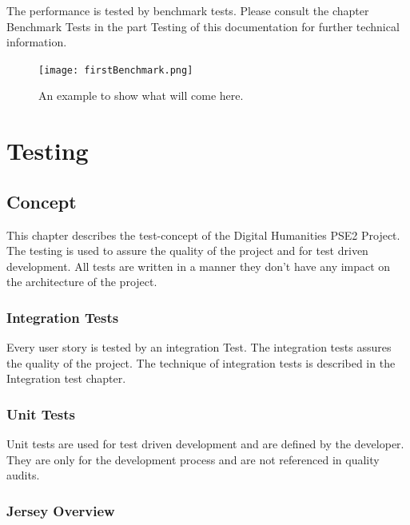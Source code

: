 \documentclass[11pt,fleqn,openany]{book} %
\begin{document}
The performance is tested by benchmark tests. Please consult the chapter Benchmark Tests in the part Testing of this documentation for further technical information.

\begin{figure}[h!]
  \caption{An example to show what will come here.}
  \centering
    \texttt{[image: firstBenchmark.png]}
\end{figure}



\part{Testing}



\chapter{Concept}
This chapter describes the test-concept of the Digital Humanities PSE2 Project. The testing is used to assure the quality of the project and for test driven development. All tests are written in a manner they don't have any impact on the architecture of the project. 

\section*{Integration Tests}
Every user story is tested by an integration Test. The integration tests assures the quality of the project. The technique of integration tests is described in the Integration test chapter. 

\section*{Unit Tests}
Unit tests are used for test driven development and are defined by the developer. They are only for the development process and are not referenced in quality audits.

\newpage

\section*{Jersey Overview} 
\end{document}
